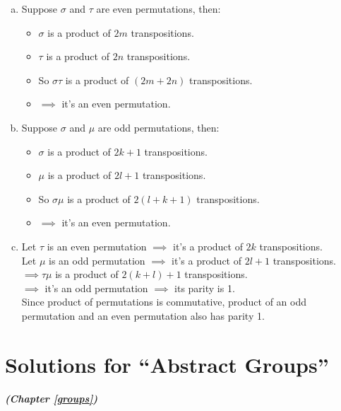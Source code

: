 \begin{enumerate}[(a)]
\item
Suppose $\sigma$ and $\tau$ are even permutations, then:
\begin{itemize}
\item
$\sigma$ is a product of $2m$ transpositions.
\item
$\tau$ is a product of $2n$ transpositions.
\item
So $\sigma\tau$ is a product of $(2m+2n)$ transpositions.
\item
$\implies$  it's an even permutation.
\end{itemize}
\item
 Suppose $\sigma$ and $\mu$ are odd permutations, then:
\begin{itemize}
\item
$\sigma$ is a product of $2k+1$ transpositions.
\item
$\mu$ is a product of $2l+1$ transpositions.
\item
So $\sigma\mu$ is a product of $2(l+k+1)$ transpositions.
\item
$\implies$  it's an even permutation.
\end{itemize}
\item
 Let $\tau$ is an even permutation $\implies$  it's a product of $2k$ transpositions.\\
Let $\mu$ is an odd permutation $\implies$  it's a product of $2l+1$ transpositions.\\
$\implies \tau\mu$ is a product of $2(k+l)+1$ transpositions.\\
$\implies$  it's an odd permutation $\implies$  its parity is 1.\\
Since product of permutations is commutative, product of an odd permutation and an even permutation also has parity 1.\\
\end{enumerate}

\section{Solutions for  ``Abstract Groups''}
\noindent\textbf{\textit{ (Chapter \ref{groups})}}\bigskip

